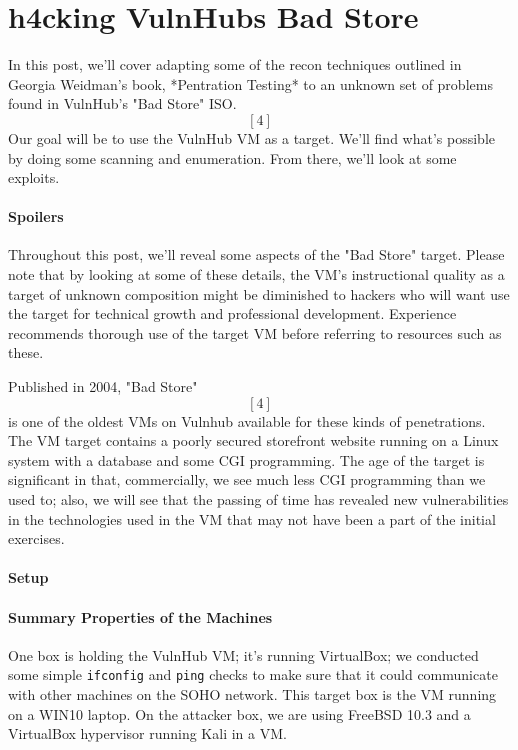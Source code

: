 \chapter{h4cking VulnHub\textquotesingle s Bad Store}

In this post, we'll cover adapting some of the recon techniques outlined in Georgia Weidman's book, *Pentration Testing* \endnote{[1]}\endnote{[2]}\endnote{[3]} to an unknown set of problems found in VulnHub's "Bad Store" ISO. \[[4]\]  Our goal will be to use the VulnHub VM as a target.  We'll find what's possible by doing some scanning and enumeration. From there, we'll look at some \gls{exploit}s.  

\subsubsection{Spoilers}
    Throughout this post, we'll reveal some aspects of the "Bad Store" target.  Please note that by looking at some of these details, the VM's instructional quality as a target of unknown composition might be diminished to hackers who will want use the target for technical growth and professional development.  Experience recommends thorough use of the target VM before referring to resources such as these.



Published in 2004, "Bad Store" \[[4]\] is one of the oldest VMs on Vulnhub available for these kinds of penetrations.  The VM target contains a poorly secured storefront website running on a Linux system with a  \gls{database} and some CGI programming.  The age of the target is significant in that, commercially, we see much less CGI programming than we used to; also, we will see that the passing of time has revealed new vulnerabilities in the technologies used in the VM that may not have been a part of the initial exercises.

\subsubsection{Setup}


\subsubsection{Summary Properties of the Machines}
One box is holding the VulnHub VM; it's running VirtualBox; we conducted some simple \texttt{ifconfig} and \texttt{ping} checks to make sure that it could communicate with other machines on the SOHO network.  This target box is the VM running on a WIN10 laptop.  On the attacker box, we are using FreeBSD 10.3 and a VirtualBox hypervisor running Kali in a VM.

